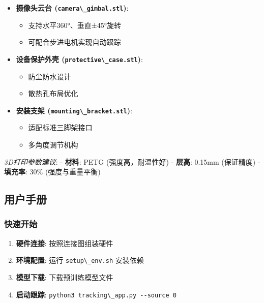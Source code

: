 \begin{itemize}
\tightlist
\item
  \textbf{摄像头云台 (\passthrough{\lstinline!camera\_gimbal.stl!})}:

  \begin{itemize}
  \tightlist
  \item
    支持水平360°、垂直±45°旋转
  \item
    可配合步进电机实现自动跟踪
  \end{itemize}
\item
  \textbf{设备保护外壳
  (\passthrough{\lstinline!protective\_case.stl!})}:

  \begin{itemize}
  \tightlist
  \item
    防尘防水设计
  \item
    散热孔布局优化
  \end{itemize}
\item
  \textbf{安装支架 (\passthrough{\lstinline!mounting\_bracket.stl!})}:

  \begin{itemize}
  \tightlist
  \item
    适配标准三脚架接口
  \item
    多角度调节机构
  \end{itemize}
\end{itemize}

\emph{3D打印参数建议}: - \textbf{材料}: PETG (强度高，耐温性好) -
\textbf{层高}: 0.15mm (保证精度) - \textbf{填充率}: 30\%
(强度与重量平衡)

\subsection{用户手册}\label{ux7528ux6237ux624bux518c}

\subsubsection{快速开始}\label{ux5febux901fux5f00ux59cb}

\begin{enumerate}
\def\labelenumi{\arabic{enumi}.}
\tightlist
\item
  \textbf{硬件连接}: 按照连接图组装硬件
\item
  \textbf{环境配置}: 运行 \passthrough{\lstinline!setup\_env.sh!}
  安装依赖
\item
  \textbf{模型下载}: 下载预训练模型文件
\item
  \textbf{启动跟踪}:
  \passthrough{\lstinline!python3 tracking\_app.py --source 0!}
\end{enumerate}

